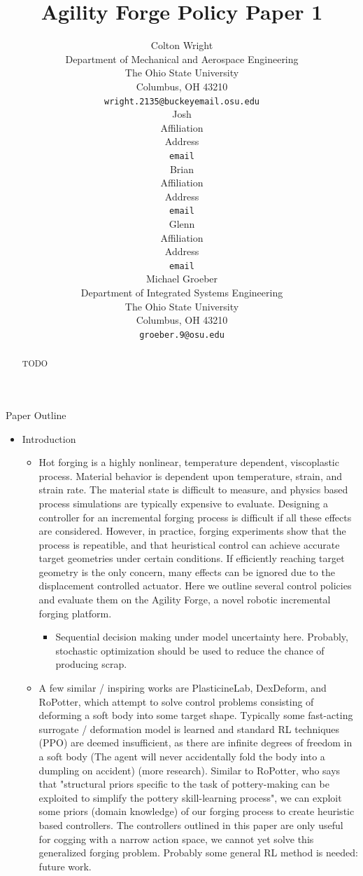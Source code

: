 \documentclass{article}
\title{Agility Forge Policy Paper 1}
\author{Colton Wright\\
	Department of Mechanical and Aerospace Engineering\\
	The Ohio State University\\
	Columbus, OH 43210 \\
	\texttt{wright.2135@buckeyemail.osu.edu} \\
	\And
	Josh \\
	Affiliation \\
	Address \\
	\texttt{email} \\
	\And
	Brian \\
	Affiliation \\
	Address \\
	\texttt{email} \\
	\And
	Glenn \\
	Affiliation \\
	Address \\
	\texttt{email} \\
	\And
	Michael Groeber\\
	Department of Integrated Systems Engineering\\
	The Ohio State University\\
	Columbus, OH 43210 \\
	\texttt{groeber.9@osu.edu} \\
}
\begin{document}
\maketitle

\begin{abstract}
	TODO
\end{abstract}



\noindent\hrulefill\quad Paper Outline \quad\hrulefill
\begin{itemize}

    \item Introduction
    \begin{itemize}
        \item Hot forging is a highly nonlinear, temperature dependent, viscoplastic process. Material behavior is dependent upon temperature, strain, and strain rate. The material state is difficult to measure, and physics based process simulations are typically expensive to evaluate. Designing a controller for an incremental forging process is difficult if all these effects are considered. However, in practice, forging experiments show that the process is repeatible, and that heuristical control can achieve accurate target geometries under certain conditions. If efficiently reaching target geometry is the only concern, many effects can be ignored due to the displacement controlled actuator. Here we outline several control policies and evaluate them on the Agility Forge, a novel robotic incremental forging platform.
        \begin{itemize}
			\item Sequential decision making under model uncertainty here. Probably, stochastic optimization should be used to reduce the chance of producing scrap.
		\end{itemize}
		\item A few similar / inspiring works are PlasticineLab, DexDeform, and RoPotter,\citep{huang_plasticinelab_2021, li_dexdeform_2023, yoo_ropotter_2024} which attempt to solve control problems consisting of deforming a soft body into some target shape. Typically some fast-acting surrogate / deformation model is learned and standard RL techniques (PPO) are deemed insufficient, as there are infinite degrees of freedom in a soft body (The agent will never accidentally fold the body into a dumpling on accident) (more research). Similar to RoPotter, who says that "structural priors specific to the task of pottery-making can be exploited to simplify the pottery skill-learning process", we can exploit some priors (domain knowledge) of our forging process to create heuristic based controllers. The controllers outlined in this paper are only useful for cogging with a narrow action space, we cannot yet solve this generalized forging problem. Probably some general RL method is needed: future work.
    \end{itemize}


\end{itemize}
\end{document}
